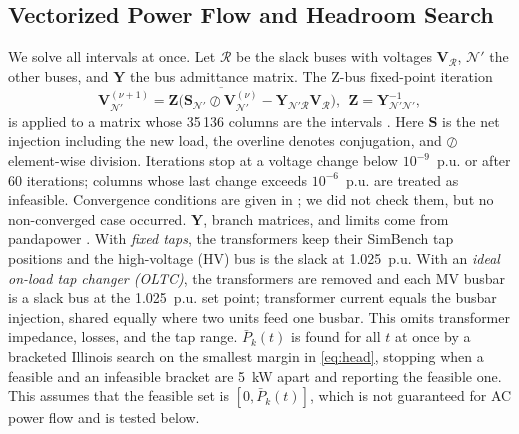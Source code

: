 \documentclass[conference,letterpaper]{IEEEtran}
\begin{document}
\subsection{Vectorized Power Flow and Headroom Search}
We solve all intervals at once. Let $\mathcal R$ be the slack buses with voltages $\mathbf V_{\mathcal R}$, $\mathcal N'$ the other buses, and $\mathbf Y$ the bus admittance matrix. The Z-bus fixed-point iteration
\begin{equation}
\mathbf V^{(\nu+1)}_{\mathcal N'}=\mathbf Z\big(\overline{\mathbf S_{\mathcal N'}\oslash \mathbf V^{(\nu)}_{\mathcal N'}}-\mathbf Y_{\mathcal N'\mathcal R}\mathbf V_{\mathcal R}\big),\ \ \mathbf Z=\mathbf Y_{\mathcal N'\mathcal N'}^{-1},\label{eq:zbus}
\end{equation}
is applied to a matrix whose 35\,136 columns are the intervals \cite{salazar2024tensor}. Here $\mathbf S$ is the net injection including the new load, the overline denotes conjugation, and $\oslash$ element-wise division. Iterations stop at a voltage change below $10^{-9}$~p.u. or after 60 iterations; columns whose last change exceeds $10^{-6}$~p.u. are treated as infeasible. Convergence conditions are given in \cite{bolognani2016,wang2018,bazrafshan2018}; we did not check them, but no non-converged case occurred. $\mathbf Y$, branch matrices, and limits come from pandapower \cite{pandapower}. With \emph{fixed taps}, the transformers keep their SimBench tap positions and the high-voltage (HV) bus is the slack at 1.025~p.u. With an \emph{ideal on-load tap changer (OLTC)}, the transformers are removed and each MV busbar is a slack bus at the 1.025~p.u. set point; transformer current equals the busbar injection, shared equally where two units feed one busbar. This omits transformer impedance, losses, and the tap range. $\bar P_k(t)$ is found for all $t$ at once by a bracketed Illinois search on the smallest margin in \eqref{eq:head}, stopping when a feasible and an infeasible bracket are 5~kW apart and reporting the feasible one. This assumes that the feasible set is $[0,\bar P_k(t)]$, which is not guaranteed for AC power flow and is tested below.
\end{document}
